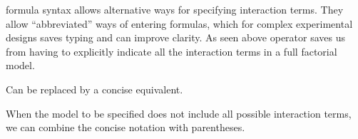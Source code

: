 \documentclass[krantz2]{krantz}\usepackage{knitr}%
\begin{document}
\begin{knitrout}\footnotesize
{}\color{fgcolor}\begin{kframe}
\begin{alltt}
 \hlopt{~}  \hlopt{+} 
 \hlopt{~}  \hlopt{+} 
\end{alltt}
\end{kframe}
\end{knitrout}

\Rlang formula syntax allows alternative ways for specifying interaction terms. They allow ``abbreviated'' ways of entering formulas, which for complex experimental designs saves typing and can improve clarity. As seen above operator \code{*} saves us from having to explicitly indicate all the interaction terms in a full factorial model.

\begin{knitrout}\footnotesize
{}\color{fgcolor}\begin{kframe}
\begin{alltt}
 \hlopt{~}  \hlopt{+}  \hlopt{+}  \hlopt{+} \hlopt{:} \hlopt{+} \hlopt{:} \hlopt{+} \hlopt{:} \hlopt{+} \hlopt{:}\hlopt{:}
\end{alltt}
\end{kframe}
\end{knitrout}

Can be replaced by a concise equivalent.

\begin{knitrout}\footnotesize
{}\color{fgcolor}\begin{kframe}
\begin{alltt}
 \hlopt{~}  \hlopt{*}  \hlopt{*} 
\end{alltt}
\end{kframe}
\end{knitrout}

When the model to be specified does not include all possible interaction terms, we can combine the concise notation with parentheses.

\begin{knitrout}\footnotesize
{}\color{fgcolor}\begin{kframe}
\begin{alltt}
 \hlopt{~}  \hlopt{+}  \hlopt{*} 
 \hlopt{~}  \hlopt{+}  \hlopt{+}  \hlopt{+} \hlopt{:}
\end{alltt}
\end{kframe}
\end{knitrout}
\end{document}
